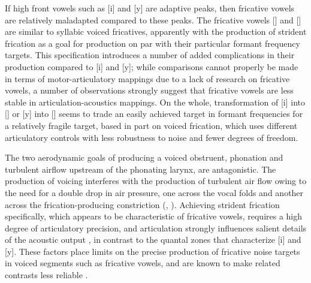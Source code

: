 \documentclass[output=paper,hidelinks]{langscibook}
\begin{document}
If high front vowels such as [i] and [y] are adaptive peaks, then fricative vowels are relatively maladapted compared to these peaks.
%
The fricative vowels [\iz{}] and [\yz{}] are similar to syllabic voiced fricatives, apparently with the production of strident frication as a goal for production on par with their particular formant frequency targets. This specification introduces a number of added complications in their production compared to [i] and [y]; while comparisons cannot properly be made in terms of motor-articulatory mappings due to a lack of research on fricative vowels, a number of observations strongly suggest that fricative vowels are less stable in articulation-acoustics mappings. On the whole, transformation of [i] into [\iz{}] or [y] into [\yz{}] seems to trade an easily achieved target in formant frequencies for a relatively fragile target, based in part on voiced frication, which uses different articulatory controls with less robustness to noise and fewer degrees of freedom.

The two aerodynamic goals of producing a voiced obstruent, phonation and turbulent airflow upstream of the phonating larynx, are antagonistic.
%
The production of voicing interferes with the production of turbulent air flow owing to the need for a double drop in air pressure, one across the vocal folds and another across the frication-producing constriction (\citealt[73--74]{catford}, \citealt{ohala83}).
%
Achieving strident frication specifically, which appears to be characteristic of fricative vowels, requires a high degree of articulatory precision, and articulation strongly influences salient details of the acoustic output \citep{iskarous2011}, in contrast to the quantal zones that characterize [i] and [y].
%
These factors place limits on the precise production of fricative noise targets in voiced segments such as fricative vowels, and are known to make related contrasts less reliable \citep{sole-fric}.
\end{document}
